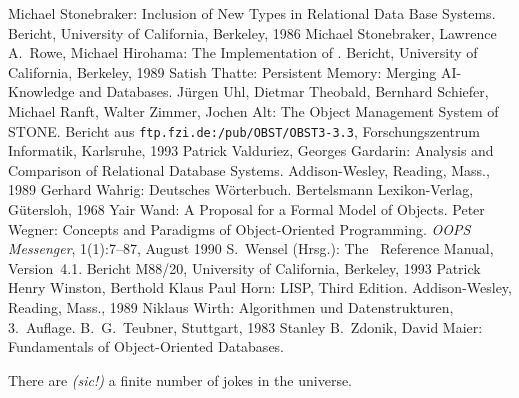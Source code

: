 \begin{thebibliography}{Stonebraker \etal\ 86a}
%
Michael Stonebraker:
Inclusion of New Types in Relational Data Base Systems.
Bericht, University of California, Berkeley, 1986
%
Michael Stonebraker, Lawrence A.\ Rowe, Michael Hirohama:
The Implementation of \postgres.
Bericht, University of California, Berkeley, 1989
%
Satish Thatte:
Persistent Memory: Merging AI-Knowledge and Databases.
%
J\"{u}rgen Uhl, Dietmar Theobald, Bernhard Schiefer, Michael Ranft,
Walter Zimmer, Jochen Alt:
The Object Management System of STONE.
Bericht aus {\tt ftp.fzi.de:/pub/OBST/OBST3-3.3},
Forschungszentrum Informatik, Karlsruhe, 1993
%
Patrick Valduriez, Georges Gardarin:
Analysis and Comparison of Relational Database Systems.
Addison-Wesley, Reading, Mass., 1989
%
Gerhard Wahrig:
Deutsches W\"{o}rterbuch.
Bertelsmann Lexikon-Verlag, G\"{u}tersloh, 1968
%
Yair Wand:
A Proposal for a Formal Model of Objects.
%
Peter Wegner:
Concepts and Paradigms of Object-Oriented Programming.
{\em OOPS Messenger\/},
1(1):7--87, August 1990
%
S.\ Wensel (Hrsg.):
The \postgres\ Reference Manual,
Version~4.1.
Bericht M88/20, University of California, Berkeley, 1993
%
Patrick Henry Winston, Berthold Klaus Paul Horn:
LISP, Third Edition.
Addison-Wesley, Reading, Mass., 1989
%
Niklaus Wirth:
Algorithmen und Datenstrukturen,
3.~Auf\-la\-ge.
B.\ G.\ Teubner, Stuttgart, 1983
%
Stanley B.\ Zdonik, David Maier:
Fundamentals of Object-Oriented Databases.
\end{thebibliography}
\vspace*{\fill}
\begin{fortune}
There are {\em (sic!)\/} a finite number of jokes in the universe.
\end{fortune}
